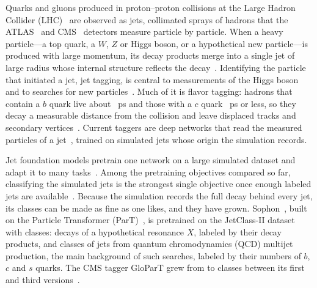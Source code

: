 \documentclass[11pt]{article}
\newcommand{\Kfull}{\VocabSizeLoneeighteight}
\begin{document}
Quarks and gluons produced in proton--proton collisions at the Large Hadron Collider
(LHC)~\cite{lhc} are observed as jets, collimated sprays of hadrons that the ATLAS~\cite{atlasdet}
and CMS~\cite{cmsdet} detectors measure particle by particle. When a heavy particle---a top quark,
a $W$, $Z$ or Higgs boson, or a hypothetical new particle---is produced with large momentum, its
decay products merge into a single jet of large radius whose internal structure reflects the
decay~\cite{larkoski,kogler}. Identifying the particle that initiated a jet, jet tagging, is
central to measurements of the Higgs boson and to searches for new particles~\cite{cmshbb,cmszprime}.
Much of it is flavor tagging: hadrons that contain a $b$ quark live about
\LitBHadronLifetimePs~ps and those with a $c$ quark \LitCHadronLifetimePs~ps or less, so they decay
a measurable distance from the collision and leave displaced tracks and secondary
vertices~\cite[Sec.~4.1]{cmsbtag}. Current taggers are deep networks that read the measured
particles of a jet~\cite{particlenet,part,gntwo,cmspart}, trained on simulated jets whose origin the
simulation records.

Jet foundation models pretrain one network on a large simulated dataset and adapt it to many
tasks~\cite{part,sophon,omnilearn,omnilearned,mpm}. Among the pretraining objectives compared so
far, classifying the simulated jets is the strongest single objective once enough labeled jets are
available~\cite{objectives}. Because the simulation records the full decay behind every jet, its
classes can be made as fine as one likes, and they have grown. Sophon~\cite{sophon}, built on the
Particle Transformer (ParT)~\cite{part}, is pretrained on the JetClass-II dataset~\cite{jetclasstwo}
with \Kfull{} classes: \LitJetClassTwoNResonantClasses{} decays of a hypothetical resonance $X$,
labeled by their decay products, and \LitJetClassTwoNQcdClasses{} classes of jets from quantum
chromodynamics (QCD) multijet production, the main background of such searches, labeled by their
numbers of $b$, $c$ and $s$ quarks. The CMS tagger GloParT grew from \LitGlopartVoneNClasses{} to
\LitGlopartVthreeNClasses{} classes between its first and third versions~\cite{glopartdp}.
\end{document}
